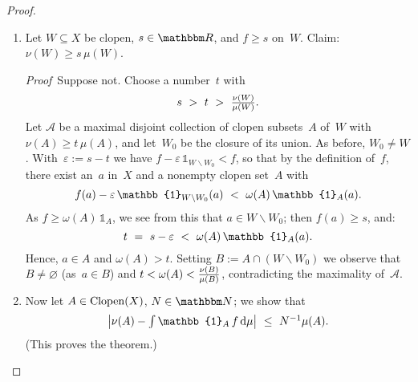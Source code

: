 \documentclass[main.tex]{subfiles}
\begin{document}
\begin{proof}
\begin{enumerate}[label=(\Roman*)]
\noindent\emph{Proof}\  Suppose not.
Choose a number~$t$ with
\begin{alignat*}{2}
s\ <\ t\ &<\ \textstyle \frac{\nu(W)}{\mu(W)}\htam{;}\\
\shortintertext{then}
t\,\mu(W)\ &<\ \nu(W)\htam{.}
\end{alignat*}
Let $\mathcal A$ be a maximal disjoint collection
of clopen subsets~$A$ of~$W$
with $\nu(A)\leq t\,\mu(A)$,
and let~$W_0$ be the closure of its union.
$W_0$ is a clopen subset of~$W$.
It follows from~\ref{6.20-6}, \ref{6.20-7}
and~\ref{6.20-9} of~\ref{6.20} that
$\nu(W_0)\leq t\,\mu(W_0)$,
so $W_0\neq W$.

By the maximality of the system~$\mathcal A$,
for every nonempty clopen $B\subseteq  W\backslash W_0$
we have $\nu(B)>t\,\mu(B)$,
which implies $\omega(W\backslash W_0)\geq t > s\geq f(x)$
for all~$x$ in~$W$.
But $f(x)\geq \omega(W\backslash W_0)$
if $x\in W\backslash W_0$.
Contradiction.
%
\item\label{6.21-II}
Let $W\subseteq X$ be clopen,
$s\in\R$, and $f\geq s$ on~$W$.
Claim: $\nu(W)\geq s\,\mu(W)$.

\noindent\emph{Proof}\  Suppose not.
Choose a number~$t$ with
\begin{equation*}
s\ >\ t\ >\ {\textstyle \frac{\nu(W)}{\mu(W)}}\text{.}
\end{equation*}
Let $\mathcal A$ be a maximal disjoint collection of
clopen subsets~$A$ of~$W$ with $\nu(A)\geq t\,\mu(A)$,
and let~$W_0$ be the closure of its union.
As before,
$W_0\neq W$.
With~$\varepsilon:=s-t$ we have
$f-\varepsilon\,\mathbb{1}_{W\backslash W_0} <f$,
so that by the definition of~$f$,
there exist an~$a$ in~$X$
and a nonempty clopen set~$A$ with
\begin{equation*}
f(a)-\varepsilon\,\mathbb{1}_{W\backslash W_0}(a)
\ <\ \omega(A)\,\mathbb{1}_A (a)\htam{.}
\end{equation*}
As $f\geq\omega(A)\,\mathbb{1}_A$,
we see from this that $a\in W\backslash W_0$;
then $f(a)\geq s$, and:
\begin{equation*}
t\ =\ s-\varepsilon\ <\ \omega(A)\,\mathbb{1}_A(a)\htam{.}
\end{equation*}
Hence, $a\in A$ and $\omega(A)>t$.
Setting $B:=A\cap(W\backslash W_0)$
we observe that $B\neq\varnothing$ (as~$a\in B$)
and $t<\omega(A)<\smash{\frac{\nu(B)}{\mu(B)}}$,
contradicting the maximality of~$\mathcal A$.

\item\label{6.21-III}
Now let $A\in\mathrm{Clopen}(X)$, $N\in\N$;
we show that
\begin{equation*}
\bigl|\textstyle  \nu(A)-\int\mathbb{1}_A\,f\,\mathrm{d}\mu\bigr|
\ \leq\ N^{-1}\mu(A)\htam{.}
\end{equation*}
(This proves the theorem.)


\end{enumerate}
\end{proof}
\end{document}
